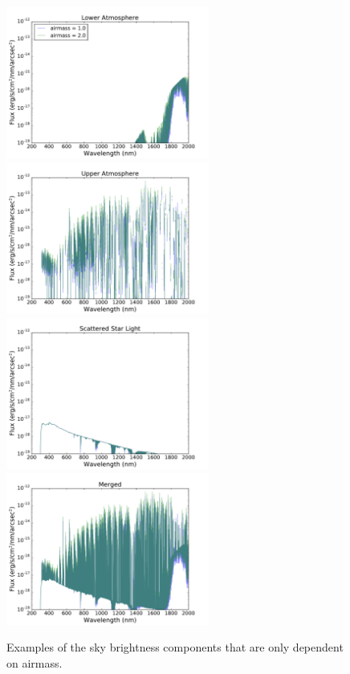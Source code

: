 \documentclass[]{spie}
\begin{document}
\begin{figure}[ht]
  \begin{center}
  \includegraphics[height=5cm]{plots/merged0.pdf}\includegraphics[height=5cm]{plots/merged1.pdf} \\
  \includegraphics[height=5cm]{plots/merged2.pdf}\includegraphics[height=5cm]{plots/merged3.pdf}
  \end{center}
  \caption{Examples of the sky brightness components that are only dependent on airmass. \label{fig:merged}}
\end{figure}
\end{document}
